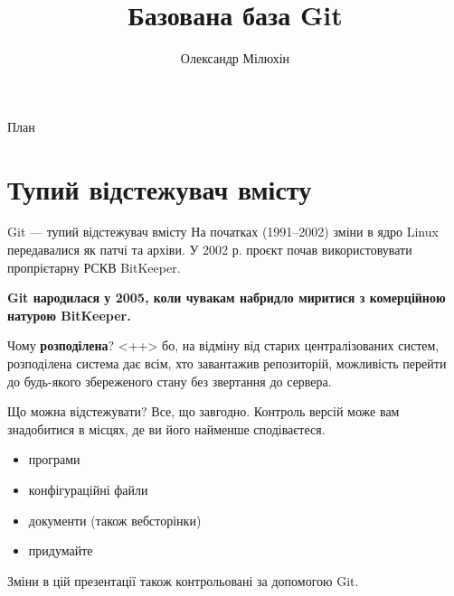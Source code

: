 \documentclass[
  ignorenonframetext,
  aspectratio=169,
]{beamer}
\title{Базована база Git}
\author{Олександр Мілюхін}
\date{}
\institute{Національний університет ``Львівська Політехніка''}
\providecommand{\tightlist}{%
  \setlength{\itemsep}{0pt}\setlength{\parskip}{0pt}}
\begin{document}
\frame{\titlepage}

\begin{frame}{План}
\protect\hypertarget{ux43fux43bux430ux43d}{}
\tableofcontents
\end{frame}

\hypertarget{ux442ux443ux43fux438ux439-ux432ux456ux434ux441ux442ux435ux436ux443ux432ux430ux447-ux432ux43cux456ux441ux442ux443}{%
\section{Тупий відстежувач
вмісту}\label{ux442ux443ux43fux438ux439-ux432ux456ux434ux441ux442ux435ux436ux443ux432ux430ux447-ux432ux43cux456ux441ux442ux443}}

\begin{frame}{Git --- тупий відстежувач вмісту}
\protect\hypertarget{git-ux442ux443ux43fux438ux439-ux432ux456ux434ux441ux442ux435ux436ux443ux432ux430ux447-ux432ux43cux456ux441ux442ux443}{}
На початках (1991--2002) зміни в ядро Linux передавалися як патчі та
архіви. У 2002 р. проєкт почав використовувати пропрієтарну РСКВ
BitKeeper.

\textbf{Git народилася у 2005, коли чувакам набридло миритися з
комерційною натурою BitKeeper.}

\begin{block}{Чому \textbf{розподілена}?}
\protect\hypertarget{ux447ux43eux43cux443-ux440ux43eux437ux43fux43eux434ux456ux43bux435ux43dux430}{}
\textless++\textgreater{} бо, на відміну від старих централізованих
систем, розподілена система дає всім, хто завантажив репозиторій,
можливість перейти до будь-якого збереженого стану без звертання до
сервера.
\end{block}
\end{frame}

\begin{frame}{Що можна відстежувати?}
\protect\hypertarget{ux449ux43e-ux43cux43eux436ux43dux430-ux432ux456ux434ux441ux442ux435ux436ux443ux432ux430ux442ux438}{}
Все, що завгодно. Контроль версій може вам знадобитися в місцях, де ви
його найменше сподіваєтеся.

\begin{itemize}
\tightlist
\item
  програми
\item
  конфігураційні файли
\item
  документи (також вебсторінки)
\item
  придумайте
\end{itemize}

Зміни в цій презентації також контрольовані за допомогою Git.
\end{frame}
\end{document}
